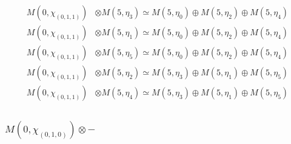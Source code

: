 \begin{align*}
M(0,\chi_{(0,1,1)}) &\otimes M(5,\eta_{3}) \simeq M(5,\eta_{0}) \oplus M(5,\eta_{2}) \oplus M(5,\eta_{4})\\
M(0,\chi_{(0,1,1)}) &\otimes M(5,\eta_{1}) \simeq M(5,\eta_{0}) \oplus M(5,\eta_{2}) \oplus M(5,\eta_{4})\\
M(0,\chi_{(0,1,1)}) &\otimes M(5,\eta_{5}) \simeq M(5,\eta_{0}) \oplus M(5,\eta_{2}) \oplus M(5,\eta_{4})\\
M(0,\chi_{(0,1,1)}) &\otimes M(5,\eta_{2}) \simeq M(5,\eta_{3}) \oplus M(5,\eta_{1}) \oplus M(5,\eta_{5})\\
M(0,\chi_{(0,1,1)}) &\otimes M(5,\eta_{4}) \simeq M(5,\eta_{3}) \oplus M(5,\eta_{1}) \oplus M(5,\eta_{5})\\
\end{align*}

\subsubsection{$ M(0,\chi_{(0,1,0)})\otimes -$}
